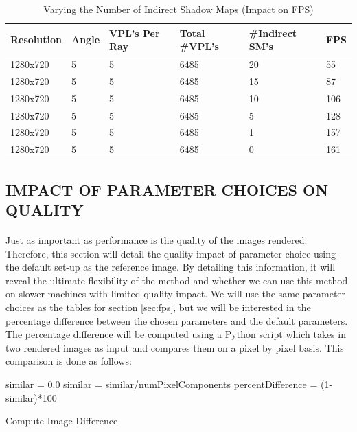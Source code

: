 \begin{table}[h!]
	\caption{Varying the Number of Indirect Shadow Maps (Impact on FPS)}
	\begin{center}
	    \begin{tabular}{ | l | l | l | l | l | l |}
	    \hline
	    Resolution & Angle & VPL's Per Ray & Total \#VPL's & \#Indirect SM's & FPS\\ \hline
	    1280x720 & 5 & 5 & 6485 & 20 & 55\\ \hline
	    1280x720 & 5 & 5 & 6485 & 15 & 87\\ \hline
	    1280x720 & 5 & 5 & 6485 & 10 & 106\\ \hline
	    1280x720 & 5 & 5 & 6485 & 5 & 128\\ \hline
	    1280x720 & 5 & 5 & 6485 & 1 & 157\\ \hline
	    1280x720 & 5 & 5 & 6485 & 0 & 161\\ \hline
	    \end{tabular}
	\end{center}
	\label{table:5.4}
\end{table}

\subsection{IMPACT OF PARAMETER CHOICES ON QUALITY} \label{sec:quality}
\paragraph{}
Just as important as performance is the quality of the images rendered.  Therefore, this section will detail the quality impact of parameter choice using the default set-up as the reference image.  By detailing this information, it will reveal the ultimate flexibility of the method and whether we can use this method on slower machines with limited quality impact.  We will use the same parameter choices as the tables for section \ref{sec:fps}, but we will be interested in the percentage difference between the chosen parameters and the default parameters.  The percentage difference will be computed using a Python script which takes in two rendered images as input and compares them on a pixel by pixel basis.  This comparison is done as follows:

\vspace{10 mm}
\begin{algorithm}[H]
 \SetAlgoLined
 similar = 0.0\;
 similar = similar/numPixelComponents\;
 percentDifference = (1-similar)*100\;
 \caption{Compute Image Difference}
 \label{alg:difference}
\end{algorithm}

